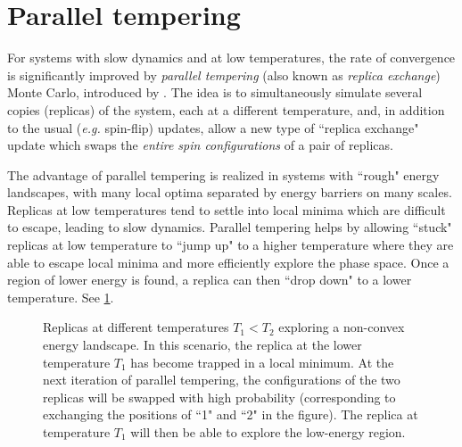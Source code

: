 \section{Parallel tempering}
\label{sec:numerical-parallel-tempering}


For systems with slow dynamics and at low temperatures, the rate of convergence
is significantly improved by \emph{parallel tempering} (also known as
\emph{replica exchange}) Monte Carlo, introduced by
\textcite{hukushima1996exchange}. The idea is to simultaneously simulate
several copies (replicas) of the system, each at a different temperature, and,
in addition to the usual (\emph{e.g.} spin-flip) updates, allow a new type of
``replica exchange" update which swaps the \emph{entire spin configurations} of
a pair of replicas.

The advantage of parallel tempering is realized in systems with ``rough" energy
landscapes, with many local optima separated by energy barriers on many scales.
Replicas at low temperatures tend to settle into local minima which are
difficult to escape, leading to slow dynamics. Parallel tempering helps by
allowing ``stuck" replicas at low temperature to ``jump up" to a higher
temperature where they are able to escape local minima and more efficiently
explore the phase space. Once a region of lower energy is found, a replica can
then ``drop down" to a lower temperature. See \cref{fig:pt-intuition}.

\begin{figure}
  \centering
  
  \caption[Replicas at different temperatures exploring a non-convex energy landscape.]
  {
    Replicas at different temperatures $T_1 < T_2$ exploring a non-convex
    energy landscape. In this scenario, the replica at the lower temperature
    $T_1$ has become trapped in a local minimum. At the next iteration of
    parallel tempering, the configurations of the two replicas will be swapped
    with high probability (corresponding to exchanging the positions of ``1"
    and ``2" in the figure). The replica at temperature $T_1$ will then be able
    to explore the low-energy region.
  }
  \label{fig:pt-intuition}
\end{figure}

